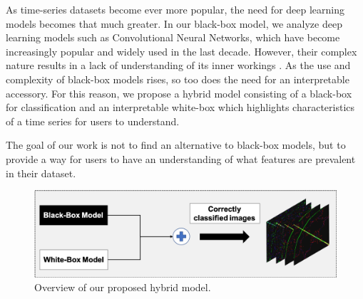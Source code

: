 \documentclass{turabian-thesis}
\begin{document}
As time-series datasets become ever more popular, the need for deep learning models becomes that much greater.
In our black-box model, we analyze deep learning models such as Convolutional Neural Networks, which have become increasingly popular and widely used in the last decade. However, their complex nature results in a lack of understanding of its inner workings \cite{wang_hybrid_2019}.
As the use and complexity of black-box models rises, so too does the need for an interpretable accessory. For this reason, we propose a hybrid model consisting of a black-box for classification and an interpretable white-box which highlights characteristics of a time series for users to understand.

The goal of our work is not to find an alternative to black-box models, but to provide a way for users to have an understanding of what features are prevalent in their dataset.

\begin{figure}[h!]
   \begin{center}
      \includegraphics[scale=0.5]{../media/overview_model.png}
   \end{center}
   \caption{Overview of our proposed hybrid model.}
   \label{fig:overview_model}
\end{figure}

\end{document}
